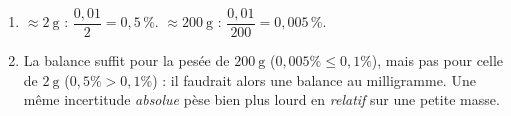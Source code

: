 \documentclass[11pt,a4paper]{article}
\begin{document}
\begin{corrige}
\begin{enumerate}[label=\alph*)]
  \item $\approx\qty{2}{\gram}$ : $\dfrac{0,01}{2}=\boxed{0,5\,\%}$. \quad
        $\approx\qty{200}{\gram}$ : $\dfrac{0,01}{200}=\boxed{0,005\,\%}$.
  \item La balance suffit pour la pesée de $\qty{200}{\gram}$ ($0,005\%\le0,1\%$), mais pas pour celle de
        $\qty{2}{\gram}$ ($0,5\%>0,1\%$) : il faudrait alors une balance au milligramme. Une même
        incertitude \emph{absolue} pèse bien plus lourd en \emph{relatif} sur une petite masse.
\end{enumerate}
\end{corrige}
\end{document}
